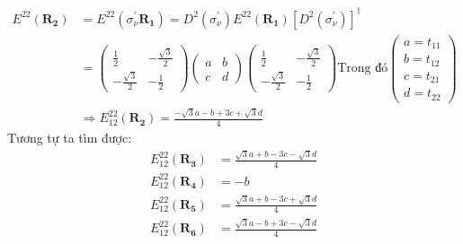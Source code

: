 \documentclass{article}
\begin{document}
\begin{align*}
	E^{22} (\mathbf{R_2}) & = E^{22}(\sigma_\nu^{'} \mathbf{R_1}) = D^2(\sigma^{'}_\nu) E^{22} (\mathbf{R_1}) [D^2(\sigma_\nu ^{'})]^\dagger \\
	                      & =
	\begin{pmatrix}
		\frac{1}{2}         & -\frac{\sqrt{3}}{2} \\
		-\frac{\sqrt{3}}{2} & -\frac{1}{2}
	\end{pmatrix} \begin{pmatrix}
		              a & b \\
		              c & d
	              \end{pmatrix}\begin{pmatrix}
		                           \frac{1}{2}         & -\frac{\sqrt{3}}{2} \\
		                           -\frac{\sqrt{3}}{2} & -\frac{1}{2}
	                           \end{pmatrix}\text{Trong đó}\begin{pmatrix}
		                                                       a = t_{11} \\
		                                                       b = t_{12} \\
		                                                       c = t_{21} \\
		                                                       d = t_{22}
	                                                       \end{pmatrix}                                                      \\
	                      & \Rightarrow E^{22}_{12} (\mathbf{R_2}) = \frac{-\sqrt{3}a - b + 3c + \sqrt{3}d}{4}
\end{align*}
Tương tự ta tìm được:
\begin{align*}
	E^{22}_{12} (\mathbf{R_3}) & = \frac{\sqrt{3}a + b - 3c - \sqrt{3}d}{4} \\
	E^{22}_{12} (\mathbf{R_4}) & = -b                                       \\
	E^{22}_{12} (\mathbf{R_5}) & = \frac{\sqrt{3}a + b - 3c + \sqrt{3}d}{4} \\
	E^{22}_{12} (\mathbf{R_6}) & = \frac{\sqrt{3}a - b + 3c - \sqrt{3}d}{4} \\
\end{align*}

\clearpage
\end{document}
